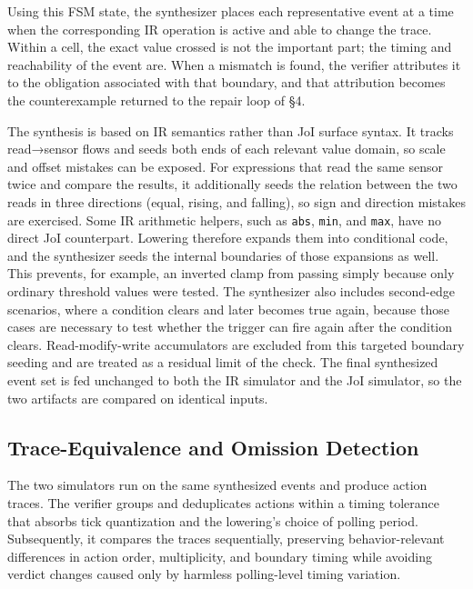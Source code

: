 \documentclass[sigconf,nonacm,anonymous,review]{acmart}
\begin{document}
Using this FSM state, the synthesizer places each representative event at a time when the corresponding IR operation is active and able to change the trace. Within a cell, the exact value crossed is not the important part; the timing and reachability of the event are. When a mismatch is found, the verifier attributes it to the obligation associated with that boundary, and that attribution becomes the counterexample returned to the repair loop of \S4.

The synthesis is based on IR semantics rather than JoI surface syntax. It tracks read→sensor flows and seeds both ends of each relevant value domain, so scale and offset mistakes can be exposed. For expressions that read the same sensor twice and compare the results, it additionally seeds the relation between the two reads in three directions (equal, rising, and falling), so sign and direction mistakes are exercised. Some IR arithmetic helpers, such as \texttt{abs}, \texttt{min}, and \texttt{max}, have no direct JoI counterpart. Lowering therefore expands them into conditional code, and the synthesizer seeds the internal boundaries of those expansions as well. This prevents, for example, an inverted clamp from passing simply because only ordinary threshold values were tested. The synthesizer also includes second-edge scenarios, where a condition clears and later becomes true again, because those cases are necessary to test whether the trigger can fire again after the condition clears. Read-modify-write accumulators are excluded from this targeted boundary seeding and are treated as a residual limit of the check. The final synthesized event set is fed unchanged to both the IR simulator and the JoI simulator, so the two artifacts are compared on identical inputs.

\subsection{Trace-Equivalence and Omission Detection}

The two simulators run on the same synthesized events and produce action traces. The verifier groups and deduplicates actions within a timing tolerance that absorbs tick quantization and the lowering's choice of polling period. Subsequently, it compares the traces sequentially, preserving %
behavior-relevant differences in action order, multiplicity, and boundary timing while avoiding verdict changes caused only by harmless polling-level timing variation.
\end{document}
